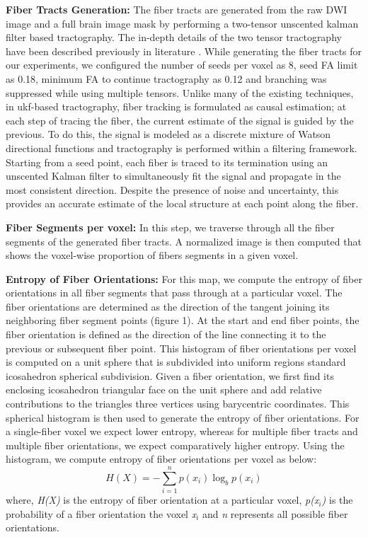 \documentclass[]{spie}  %
\begin{document}
\textbf{Fiber Tracts Generation: }The fiber tracts are generated from the raw DWI image and a full brain image mask by performing a two-tensor unscented kalman filter based tractography. The in-depth details of the two tensor tractography have been described previously in literature \cite{malc10}. While generating the fiber tracts for our experiments, we configured the number of seeds per voxel as 8, seed FA limit as 0.18, minimum FA to continue tractography as 0.12 and branching was suppressed while using multiple tensors.
Unlike many of the existing techniques, in ukf-based tractography, fiber tracking is formulated as causal estimation; at each step of tracing the fiber, the current estimate of the signal is guided by the previous. To do this, the signal is modeled as a discrete mixture of Watson directional functions and tractography is performed within a filtering framework. Starting from a seed point, each fiber is traced to its termination using an unscented Kalman filter to simultaneously fit the signal and propagate in the most consistent direction. Despite the presence of noise and uncertainty, this provides an accurate estimate of the local structure at each point along the fiber.

\textbf{Fiber Segments per voxel: }In this step, we traverse through all the fiber segments of the generated  fiber tracts. A normalized image is then computed that shows the voxel-wise proportion of fibers segments in a given voxel.

\textbf{Entropy of Fiber Orientations: }For this map, we compute the entropy of fiber orientations in all fiber segments that pass through at a particular voxel. The fiber orientations are determined as the direction of the tangent joining its neighboring fiber segment points (figure 1). At the start and end fiber points, the fiber orientation is defined as the direction of the line connecting it to the previous or subsequent fiber point. This histogram of fiber orientations per voxel is computed on a unit sphere that is subdivided into uniform regions standard icosahedron spherical subdivision. Given a fiber orientation, we first find its enclosing icosahedron triangular face on the unit sphere and add relative contributions to the triangles three vertices using barycentric coordinates. This spherical histogram is then used to generate the entropy of fiber orientations. For a single-fiber voxel we expect lower entropy, whereas for multiple fiber tracts and multiple fiber orientations, we expect comparatively higher entropy. Using the histogram, we compute entropy of fiber orientations per voxel as below:
\begin{equation}
H(X) = - \sum_{i=1}^n p(x_i) \log_{b} p(x_i)
\end{equation}
where, \textit{H(X)} is the entropy of fiber orientation at a particular voxel, \textit{p(x$_{i}$)} is the probability of a fiber orientation the voxel \textit{x$_{i}$} and \textit{n} represents all possible fiber orientations.
\end{document}
